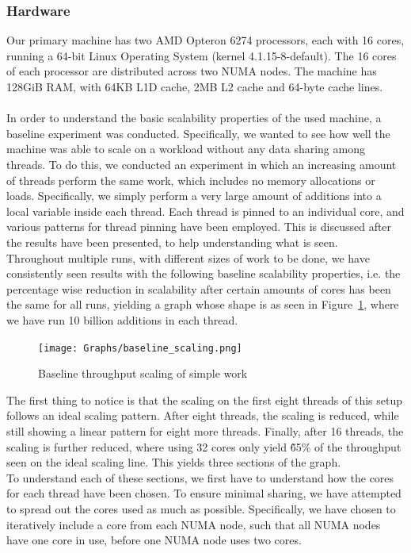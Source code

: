 \documentclass[11pt]{article} %
\begin{document}
\subsubsection{Hardware}
\label{subsubsec:hardware}
Our primary machine has two AMD Opteron 6274 processors, each with 16 cores, running a 64-bit Linux Operating System (kernel 4.1.15-8-default). The 16 cores of each processor are distributed across two NUMA nodes. The machine has 128GiB RAM, with 64KB L1D cache, 2MB L2 cache and 64-byte cache lines. \\
\\
In order to understand the basic scalability properties of the used machine, a baseline experiment was conducted. Specifically, we wanted to see how well the machine was able to scale on a workload without any data sharing among threads. To do this, we conducted an experiment in which an increasing amount of threads perform the same work, which includes no memory allocations or loads. Specifically, we simply perform a very large amount of additions into a local variable inside each thread. Each thread is pinned to an individual core, and various patterns for thread pinning have been employed. This is discussed after the results have been presented, to help understanding what is seen.\\

Throughout multiple runs, with different sizes of work to be done, we have consistently seen results with the following baseline scalability properties, i.e. the percentage wise reduction in scalability after certain amounts of cores has been the same for all runs, yielding a graph whose shape is as seen in Figure~\ref{fig:baseline_scaling}, where we have run 10 billion additions in each thread.  

\begin{figure}[H]
  \centering
  \texttt{[image: Graphs/baseline\_scaling.png]}
  \caption{Baseline throughput scaling of simple work}
  \label{fig:baseline_scaling}
\end{figure}
The first thing to notice is that the scaling on the first eight threads of this setup follows an ideal scaling pattern. After eight threads, the scaling is reduced, while still showing a linear pattern for eight more threads. Finally, after 16 threads, the scaling is further reduced, where using 32 cores only yield \~65\% of the throughput seen on the ideal scaling line. This yields three sections of the graph. \\

To understand each of these sections, we first have to understand how the cores for each thread have been chosen. To ensure minimal sharing, we have attempted to spread out the cores used as much as possible. Specifically, we have chosen to iteratively include a core from each NUMA node, such that all NUMA nodes have one core in use, before one NUMA node uses two cores. 
\end{document}
